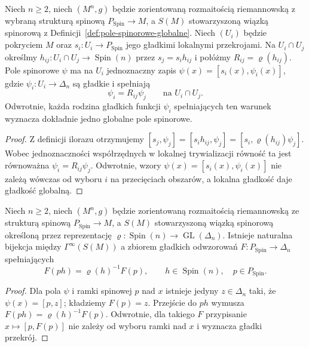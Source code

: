 \begin{stwierdzenie}
\label{prop:pola-spinorowe-sklejanie}
Niech $n\geq2$, niech $(M^n,g)$ będzie zorientowaną rozmaitością
riemannowską z wybraną strukturą spinową
$P_{\mathrm{Spin}}\to M$, a $S(M)$ stowarzyszoną
wiązką spinorową z Definicji~\ref{def:pole-spinorowe-globalne}.
Niech $(U_i)$ będzie pokryciem $M$ oraz
$s_i:U_i\to P_{\mathrm{Spin}}$ jego gładkimi lokalnymi
przekrojami. Na $U_i\cap U_j$ określmy
$h_{ij}:U_i\cap U_j\to\operatorname{Spin}(n)$ przez
$s_j=s_i h_{ij}$ i połóżmy $R_{ij}=\varrho(h_{ij})$.
Pole spinorowe $\psi$ ma na $U_i$ jednoznaczny zapis
$\psi(x)=[s_i(x),\psi_i(x)]$, gdzie $\psi_i:U_i\to\Delta_n$
są gładkie i spełniają
\begin{equation}\label{eq:pola-spinorowe-przejscie}
 \psi_i=R_{ij}\psi_j\qquad\text{na }U_i\cap U_j.
\end{equation}
Odwrotnie, każda rodzina gładkich funkcji $\psi_i$
spełniających ten warunek wyznacza dokładnie jedno globalne
pole spinorowe.
\end{stwierdzenie}
\begin{proof}
Z definicji ilorazu otrzymujemy
$[s_j,\psi_j]=[s_i h_{ij},\psi_j]
=[s_i,\varrho(h_{ij})\psi_j]$.
Wobec jednoznaczności współrzędnych w lokalnej
trywializacji równość ta jest równoważna
$\psi_i=R_{ij}\psi_j$. Odwrotnie, wzory
$\psi(x)=[s_i(x),\psi_i(x)]$ nie zależą wówczas od wyboru
$i$ na przecięciach obszarów, a lokalna gładkość daje
gładkość globalną.
\end{proof}

\begin{stwierdzenie}
\label{prop:pola-spinorowe-ekwiwariantnosc}
Niech $n\geq2$, niech $(M^n,g)$ będzie zorientowaną
rozmaitością riemannowską ze strukturą spinową
$P_{\mathrm{Spin}}\to M$, a $S(M)$ stowarzyszoną
wiązką spinorową określoną przez reprezentację
$\varrho:\operatorname{Spin}(n)\to\operatorname{GL}(\Delta_n)$.
Istnieje naturalna bijekcja między
$\Gamma^\infty(S(M))$ a zbiorem gładkich odwzorowań
$F:P_{\mathrm{Spin}}\to\Delta_n$ spełniających
\begin{equation}\label{eq:pola-spinorowe-ekwiwariantnosc}
 F(ph)=\varrho(h)^{-1}F(p),\qquad
 h\in\operatorname{Spin}(n),\quad p\in P_{\mathrm{Spin}}.
\end{equation}
\end{stwierdzenie}
\begin{proof}
Dla pola $\psi$ i ramki spinowej $p$ nad $x$ istnieje
jedyny $z\in\Delta_n$ taki, że $\psi(x)=[p,z]$;
kładziemy $F(p)=z$. Przejście do $ph$ wymusza
$F(ph)=\varrho(h)^{-1}F(p)$. Odwrotnie, dla takiego $F$
przypisanie $x\mapsto[p,F(p)]$ nie zależy od wyboru
ramki nad $x$ i wyznacza gładki przekrój.
\end{proof}


